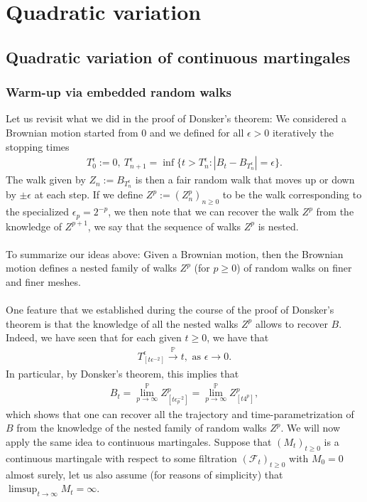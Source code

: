 \documentclass[../mainfile.tex]{subfiles}
\begin{document}
\section{Quadratic variation}
\subsection{Quadratic variation of continuous martingales}
\subsubsection{Warm-up via embedded random walks}
Let us revisit what we did in the proof of Donsker's theorem: We considered a Brownian motion started from $0$ and we defined for all $\epsilon>0$ iteratively the stopping times 
\begin{align*}
T_0^\epsilon:=0, \ T_{n+1}^\epsilon = \inf \{ t >T_n^\epsilon : |B_t-B_{T_n^\epsilon}| = \epsilon\}.
\end{align*}
The walk given by $Z_n:= B_{T_n^\epsilon}$ is then a fair random walk that moves up or down by $\pm \epsilon$ at each step. If we define $Z^p:= (Z_n^p)_{n \geq 0}$ to be the walk corresponding to the specialized $\epsilon_p= 2^{-p}$, we then note that we can recover the walk $Z^p$ from the knowledge of $Z^{p+1}$, we say that the sequence of walks $Z^p$  is nested.
\\\\
To summarize our ideas above: Given a Brownian motion, then the Brownian motion defines a nested family of walks $Z^p$ (for $p \geq 0$) of random walks on finer and finer meshes. 
\\\\
One feature that we established during the course of the proof of Donsker's theorem is that the knowledge of all the nested walks $Z^p$ allows to recover $B$. Indeed, we have seen that for each given $t \geq 0$, we have that 
\begin{align*}
T_{[ t \epsilon^{-2}]}^\epsilon \overset{\mathbb{P}}\longrightarrow t, \text{ as } \epsilon \to 0.
\end{align*}
In particular, by Donsker's theorem, this implies that 
\begin{align*}
B_t =\lim_{p \to \infty}^\mathbb{P} Z^p_{[t \epsilon_p^{-2}]} = \lim_{p \to \infty}^\mathbb{P} Z^p_{[t4^p]},
\end{align*}
which shows that one can recover all the trajectory and time-parametrization of $B$ from the knowledge of the nested family of random walks $Z^p$. 
\newpage
We will now apply the same idea to continuous martingales. Suppose that $(M_t)_{t \geq 0}$  is a continuous martingale with respect to some filtration $( \mathcal{F}_t)_{t \geq 0}$ with $M_0=0$ almost surely, let us also assume (for reasons of simplicity) that $\limsup_{t \to \infty} M_t = \infty$. 
\end{document}
